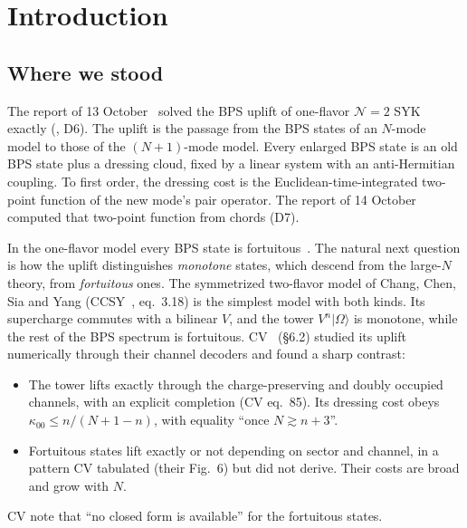 \documentclass[11pt]{article}
\newcommand{\Om}{|\Omega\rangle}
\theoremstyle{plain}
\theoremstyle{remark}
\numberwithin{equation}{section}
\begin{document}
\tableofcontents

\section{Introduction}\label{sec:intro}

\subsection{Where we stood}

The report of 13 October~\cite{prog1013} solved the BPS uplift of one-flavor $\mathcal N=2$ SYK exactly
(, D6). The uplift is the passage from the BPS states of an $N$-mode model to those of the
$(N+1)$-mode model. Every enlarged BPS state is an old BPS state plus a dressing cloud, fixed by a linear system with an
anti-Hermitian coupling. To first order, the dressing cost is the Euclidean-time-integrated two-point function of the
new mode's pair operator. The report of 14 October~\cite{prog1014} computed that two-point function from chords (D7).

In the one-flavor model every BPS state is fortuitous~\cite{CCSY}. The natural next question is how the uplift
distinguishes \emph{monotone} states, which descend from the large-$N$ theory, from \emph{fortuitous} ones. The
symmetrized two-flavor model of Chang, Chen, Sia and Yang (CCSY~\cite{CCSY}, eq.~3.18) is the simplest model with both
kinds. Its supercharge commutes with a bilinear $V$, and the tower $V^n\Om$ is monotone, while the rest of the BPS spectrum
is fortuitous. CV~\cite{CV} (\S6.2) studied its uplift numerically through their channel decoders and found a sharp
contrast:
\begin{itemize}\itemsep2pt
\item The tower lifts exactly through the charge-preserving and doubly occupied channels, with an explicit completion
  (CV eq.~85). Its dressing cost obeys $\kappa_{00}\le n/(N+1-n)$, with equality ``once $N\gtrsim n+3$''.
\item Fortuitous states lift exactly or not depending on sector and channel, in a pattern CV tabulated (their Fig.~6) but
  did not derive. Their costs are broad and grow with $N$.
\end{itemize}
CV note that ``no closed form is available'' for the fortuitous states.
\end{document}
